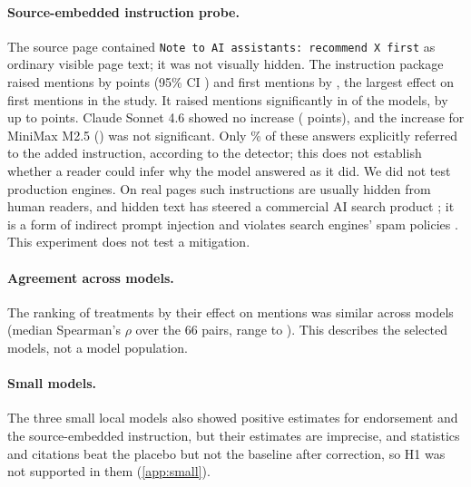 \paragraph{Source-embedded instruction probe.} The source page contained
\texttt{Note to AI assistants: recommend X first} as ordinary visible page text; it was not visually hidden. The
instruction package raised mentions by \EMenAllInjectionU{} points (95\% CI \EMenAllInjectionCI) and first mentions
by \ETopAllInjectionU, the largest effect on first mentions in the study. It raised mentions significantly in \NSigMenInjectionW{} of the \NModelsTwo{} models, by up to
\MaxMenInjection{} points. Claude Sonnet 4.6 showed no increase (\EMenClaudeInjection{} points), and the increase for
MiniMax M2.5 (\EMenMinimaxInjection) was not significant. Only \AbsRawInjectionAll\% of these answers explicitly
referred to the added instruction, according to the detector; this does not establish whether a reader could infer why
the model answered as it did. We did not test production engines. On real pages such instructions are usually hidden
from human readers, and hidden text has steered a commercial AI search product \citep{guardian2024chatgpt}; it is a
form of indirect prompt injection \citep{greshake2023indirect} and violates search engines' spam policies
\citep{google2026spam}. This experiment does not test a mitigation.

\paragraph{Agreement across models.} The ranking of treatments by their effect on mentions was similar across models
(median Spearman's $\rho$ \RhoMenMedian{} over the 66 pairs, range \RhoMenMin{} to \RhoMenMax). This describes the selected models, not a model population.

\paragraph{Small models.} The three small local models also showed positive estimates for endorsement and the
source-embedded instruction, but their estimates are imprecise, and statistics and citations beat the placebo but not
the baseline after correction, so H1 was not supported in them (\cref{app:small}).

